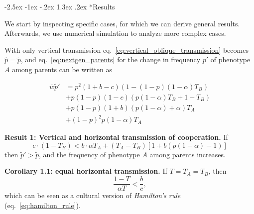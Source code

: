\documentclass[12pt]{extarticle}
\makeatletter
\renewcommand\section{\@startsection {section}{1}{\z@}%
     {-2.5ex \@plus -1ex \@minus -.2ex}%
     {1.3ex \@plus.2ex}%
    {\Large\bfseries}}
\makeatother
\begin{document}
\section*{Results}

We start by inspecting specific cases, for which we can derive general results. 
Afterwards, we use numerical simulation to analyze more complex cases.

With only vertical transmission eq.~\ref{eq:vertical_oblique_transmission} becomes
$\hat{p} =  \tilde{p}$,
and eq.~\ref{eq:nextgen_parents} for the change in frequency $p'$ of phenotype $A$ among parents can be written as

\begin{equation} 
\begin{split}\label{eq:nextgen_parents_vertical_only}
\bar{w} \tilde{p}' 
& = p^2 (1+b-c) (1 - (1-p) (1-\alpha) T_B) \\
& + p(1-p) (1-c) (p (1-\alpha) T_B + 1 - T_B) \\
& + p(1-p) (1+b) (p (1-\alpha) + \alpha) T_A \\
& + (1-p)^2 p (1-\alpha) T_A
\end{split}
\end{equation}

\textbf{Result 1: Vertical and horizontal transmission of cooperation.}
If 
\begin{equation}\label{result1}
c \cdot (1-T_B) < b \cdot  \alpha T_A  + (T_A - T_B) [1 + b (p(1-\alpha) - 1)]
\end{equation}
then $\tilde{p}' > \tilde{p}$, and the frequency of phenotype $A$ among parents increases. 

\textbf{Corollary 1.1: equal horizontal transmission.}
If $T=T_A=T_B$, then
\begin{equation}
\label{eq:equal_transmission}
\frac{1-T}{\alpha T} < \frac{b}{c},
\end{equation}
which can be seen as a cultural version of \emph{Hamilton's rule} (eq.~\ref{eq:hamilton_rule}).

	
\end{document}
